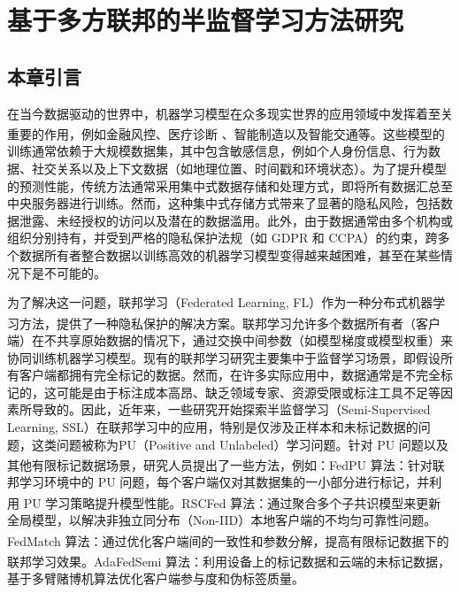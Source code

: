 

\chapter{基于多方联邦的半监督学习方法研究} %

\thispagestyle{others} %

\pagestyle{others} %

\xiaosi %


\section{本章引言}
在当今数据驱动的世界中，机器学习模型在众多现实世界的应用领域中发挥着至关重要的作用，例如金融风控\textsuperscript{\cite{hardt2016equality, rudin2019stop}}、医疗诊断 \textsuperscript{\cite{esteva2017dermatologist, miotto2018deep}}、智能制造\textsuperscript{\cite{lee2015cyber, tao2018digital}}以及智能交通\textsuperscript{\cite{wang2019deep, zhang2019short}}等。这些模型的训练通常依赖于大规模数据集，其中包含敏感信息，例如个人身份信息、行为数据、社交关系以及上下文数据（如地理位置、时间戳和环境状态）。为了提升模型的预测性能，传统方法通常采用集中式数据存储和处理方式，即将所有数据汇总至中央服务器进行训练。然而，这种集中式存储方式带来了显著的隐私风险，包括数据泄露、未经授权的访问以及潜在的数据滥用。此外，由于数据通常由多个机构或组织分别持有，并受到严格的隐私保护法规（如 GDPR 和 CCPA）的约束，跨多个数据所有者整合数据以训练高效的机器学习模型变得越来越困难，甚至在某些情况下是不可能的。

为了解决这一问题，联邦学习（Federated Learning, FL）作为一种分布式机器学习方法\textsuperscript{\cite{mcmahan2017communication}}，提供了一种隐私保护的解决方案。联邦学习允许多个数据所有者（客户端）在不共享原始数据的情况下，通过交换中间参数（如模型梯度或模型权重）来协同训练机器学习模型。现有的联邦学习研究主要集中于监督学习场景，即假设所有客户端都拥有完全标记的数据。然而，在许多实际应用中，数据通常是不完全标记的，这可能是由于标注成本高昂、缺乏领域专家、资源受限或标注工具不足等因素所导致的。因此，近年来，一些研究开始探索半监督学习（Semi-Supervised Learning, SSL）在联邦学习中的应用，特别是仅涉及正样本和未标记数据的问题，这类问题被称为PU（Positive and Unlabeled）学习问题。针对 PU 问题以及其他有限标记数据场景，研究人员提出了一些方法，例如：FedPU 算法\textsuperscript{\cite{lin2022federated}}：针对联邦学习环境中的 PU 问题，每个客户端仅对其数据集的一小部分进行标记，并利用 PU 学习策略提升模型性能。RSCFed 算法\textsuperscript{\cite{liang2022rscfed}}：通过聚合多个子共识模型来更新全局模型，以解决非独立同分布（Non-IID）本地客户端的不均匀可靠性问题。FedMatch 算法\textsuperscript{\cite{jeong2020federated}}：通过优化客户端间的一致性和参数分解，提高有限标记数据下的联邦学习效果。AdaFedSemi 算法\textsuperscript{\cite{wang2022enhancing}}：利用设备上的标记数据和云端的未标记数据，基于多臂赌博机算法优化客户端参与度和伪标签质量。

